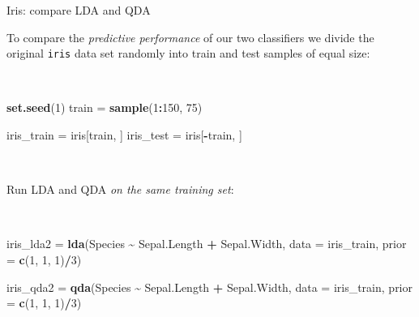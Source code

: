 \documentclass[
  10pt,
  ignorenonframetext,
]{beamer}
\newenvironment{Shaded}{\begin{snugshade}}{\end{snugshade}}
\newcommand{\AttributeTok}[1]{\textcolor[rgb]{0.13,0.29,0.53}{#1}}
\newcommand{\DecValTok}[1]{\textcolor[rgb]{0.00,0.00,0.81}{#1}}
\newcommand{\FunctionTok}[1]{\textcolor[rgb]{0.13,0.29,0.53}{\textbf{#1}}}
\newcommand{\NormalTok}[1]{#1}
\newcommand{\OtherTok}[1]{\textcolor[rgb]{0.56,0.35,0.01}{#1}}
\newcommand{\SpecialCharTok}[1]{\textcolor[rgb]{0.81,0.36,0.00}{\textbf{#1}}}
\begin{document}
\begin{frame}[fragile]
\begin{block}{Iris: compare LDA and QDA}
\protect\hypertarget{iris-compare-lda-and-qda}{}
\vspace{2mm}

To compare the \emph{predictive performance} of our two classifiers we
divide the original \texttt{iris} data set randomly into train and test
samples of equal size:

\(~\)

\scriptsize

\begin{Shaded}
\begin{Highlighting}[]
\FunctionTok{set.seed}\NormalTok{(}\DecValTok{1}\NormalTok{)}
\NormalTok{train }\OtherTok{=} \FunctionTok{sample}\NormalTok{(}\DecValTok{1}\SpecialCharTok{:}\DecValTok{150}\NormalTok{, }\DecValTok{75}\NormalTok{)}

\NormalTok{iris\_train }\OtherTok{=}\NormalTok{ iris[train, ]}
\NormalTok{iris\_test }\OtherTok{=}\NormalTok{ iris[}\SpecialCharTok{{-}}\NormalTok{train, ]}
\end{Highlighting}
\end{Shaded}

\normalsize

\(~\)

Run LDA and QDA \emph{on the same training set}:

\(~\)

\scriptsize

\begin{Shaded}
\begin{Highlighting}[]
\NormalTok{iris\_lda2 }\OtherTok{=} \FunctionTok{lda}\NormalTok{(Species }\SpecialCharTok{\textasciitilde{}}\NormalTok{ Sepal.Length }\SpecialCharTok{+}\NormalTok{ Sepal.Width, }\AttributeTok{data =}\NormalTok{ iris\_train,}
    \AttributeTok{prior =} \FunctionTok{c}\NormalTok{(}\DecValTok{1}\NormalTok{, }\DecValTok{1}\NormalTok{, }\DecValTok{1}\NormalTok{)}\SpecialCharTok{/}\DecValTok{3}\NormalTok{)}

\NormalTok{iris\_qda2 }\OtherTok{=} \FunctionTok{qda}\NormalTok{(Species }\SpecialCharTok{\textasciitilde{}}\NormalTok{ Sepal.Length }\SpecialCharTok{+}\NormalTok{ Sepal.Width, }\AttributeTok{data =}\NormalTok{ iris\_train,}
    \AttributeTok{prior =} \FunctionTok{c}\NormalTok{(}\DecValTok{1}\NormalTok{, }\DecValTok{1}\NormalTok{, }\DecValTok{1}\NormalTok{)}\SpecialCharTok{/}\DecValTok{3}\NormalTok{)}
\end{Highlighting}
\end{Shaded}
\end{block}
\end{frame}
\end{document}
